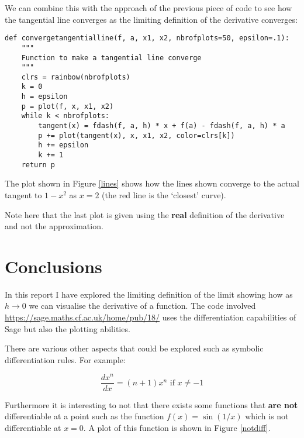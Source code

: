 \documentclass[a4paper]{article}
\begin{document}
We can combine this with the approach of the previous piece of code to see how the tangential line converges as the limiting definition of the derivative converges:

\begin{verbatim}
def convergetangentialline(f, a, x1, x2, nbrofplots=50, epsilon=.1):
    """
    Function to make a tangential line converge
    """
    clrs = rainbow(nbrofplots)
    k = 0
    h = epsilon
    p = plot(f, x, x1, x2)
    while k < nbrofplots:
        tangent(x) = fdash(f, a, h) * x + f(a) - fdash(f, a, h) * a
        p += plot(tangent(x), x, x1, x2, color=clrs[k])
        h += epsilon
        k += 1
    return p
\end{verbatim}

The plot shown in Figure \ref{lines} shows how the lines shown converge to the actual tangent to $1-x^2$ as $x=2$ (the red line is the `closest' curve).


Note here that the last plot is given using the \textbf{real} definition of the derivative and not the approximation.

\section{Conclusions}

In this report I have explored the limiting definition of the limit showing how as $h\to 0$ we can visualise the derivative of a function. The code involved \url{https://sage.maths.cf.ac.uk/home/pub/18/} uses the differentiation capabilities of Sage but also the plotting abilities.

There are various other aspects that could be explored such as symbolic differentiation rules. For example:

$$\frac{dx^n}{dx}=(n+1)x^{n}\text{ if }x\ne-1$$

Furthermore it is interesting to not that there exists some functions that \textbf{are not} differentiable at a point such as the function $f(x)=\sin(1/x)$ which is not differentiable at $x=0$. A plot of this function is shown in Figure \ref{notdiff}.
\end{document}
